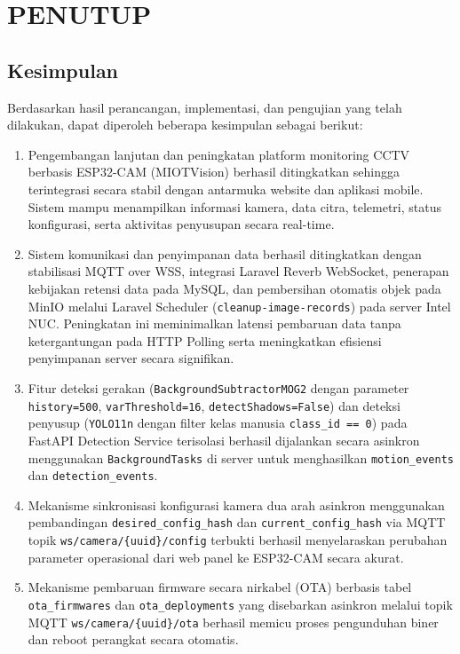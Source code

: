 \chapter{PENUTUP}
\label{sec:chap5_penutup}

\section{Kesimpulan}

Berdasarkan hasil perancangan, implementasi, dan pengujian yang telah dilakukan, dapat diperoleh beberapa kesimpulan sebagai berikut:

\begin{enumerate}
	
	\item Pengembangan lanjutan dan peningkatan platform monitoring CCTV berbasis ESP32-CAM (MIOTVision) berhasil ditingkatkan sehingga terintegrasi secara stabil dengan antarmuka website dan aplikasi mobile. Sistem mampu menampilkan informasi kamera, data citra, telemetri, status konfigurasi, serta aktivitas penyusupan secara real-time.
	
	\item Sistem komunikasi dan penyimpanan data berhasil ditingkatkan dengan stabilisasi MQTT over WSS, integrasi Laravel Reverb WebSocket, penerapan kebijakan retensi data pada MySQL, dan pembersihan otomatis objek pada MinIO melalui Laravel Scheduler (\texttt{cleanup-image-records}) pada server Intel NUC. Peningkatan ini meminimalkan latensi pembaruan data tanpa ketergantungan pada HTTP Polling serta meningkatkan efisiensi penyimpanan server secara signifikan.
	
	\item Fitur deteksi gerakan (\texttt{BackgroundSubtractorMOG2} dengan parameter \texttt{history=500}, \texttt{varThreshold=16}, \texttt{detectShadows=False}) dan deteksi penyusup (\texttt{YOLO11n} dengan filter kelas manusia \texttt{class\_id == 0}) pada FastAPI Detection Service terisolasi berhasil dijalankan secara asinkron menggunakan \texttt{BackgroundTasks} di server untuk menghasilkan \texttt{motion\_events} dan \texttt{detection\_events}.
	
	\item Mekanisme sinkronisasi konfigurasi kamera dua arah asinkron menggunakan pembandingan \texttt{desired\_config\_hash} dan \texttt{current\_config\_hash} via MQTT topik \texttt{ws/camera/\{uuid\}/config} terbukti berhasil menyelaraskan perubahan parameter operasional dari web panel ke ESP32-CAM secara akurat.
	
	\item Mekanisme pembaruan firmware secara nirkabel (OTA) berbasis tabel \texttt{ota\_firmwares} dan \texttt{ota\_deployments} yang disebarkan asinkron melalui topik MQTT \texttt{ws/camera/\{uuid\}/ota} berhasil memicu proses pengunduhan biner dan reboot perangkat secara otomatis.
	
\end{enumerate}

